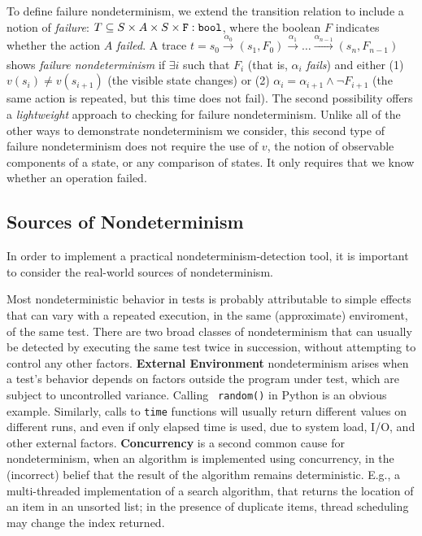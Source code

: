 To define failure nondeterminism, we extend the
transition relation to include a notion of \emph{failure}: $T \subseteq S
\times A \times S \times {\tt F: bool}$, where the boolean $F$ indicates
whether the action $A$ \emph{failed}.   A trace $t = s_0
\xrightarrow[]{\alpha_0} (s_1, F_0) \xrightarrow[]{\alpha_1} \ldots
\xrightarrow[]{\alpha_{n-1}} (s_n, F_{n-1})$ shows \emph{failure
  nondeterminism} if $\exists i$ such that $F_{i}$ (that is,
$\alpha_i$ \emph{fails}) and either (1) $v(s_{i}) \neq v(s_{i+1})$
(the visible state changes) or (2)
$\alpha_i = \alpha_{i+1} \wedge \neg F_{i+1}$ (the same action is
repeated, but this time does not fail).  The second possibility
offers a \emph{lightweight} approach to checking for failure
nondeterminism.  Unlike all of the other ways to demonstrate
nondeterminism we consider, this second type of failure nondeterminism does not
require the use of $v$, the notion of observable components of
a state, or any comparison of states.  It only
requires that we know whether an operation failed.

\subsection{Sources of Nondeterminism}
\label{sec:sources}

In order to implement a practical nondeterminism-detection tool, it is
important to consider the real-world sources of nondeterminism.  

Most nondeterministic behavior in tests is probably attributable to simple
effects that can vary with a repeated execution, in the same
(approximate) enviroment, of the same test.  There are two broad classes of
nondeterminism that can usually be detected by
executing the same test twice in succession, without attempting
to control any other factors.  {\bf External Environment} nondeterminism arises
  when a test's behavior depends on factors outside the program under
  test, which are subject to uncontrolled variance.  Calling {\tt
    random()} in Python is an obvious example. Similarly, calls to {\tt time}
  functions  will usually return different values on different runs,
  and even if only elapsed time is used, due to system load, I/O, and
  other external factors.  {\bf Concurrency} is a second common cause for
  nondeterminism, when an algorithm is implemented using
  concurrency, in the (incorrect) belief that the result of the
  algorithm remains deterministic.  E.g., a multi-threaded
  implementation of a search algorithm, that returns the location of
  an item in an unsorted list; in the presence of duplicate items, thread scheduling may change the index returned.

